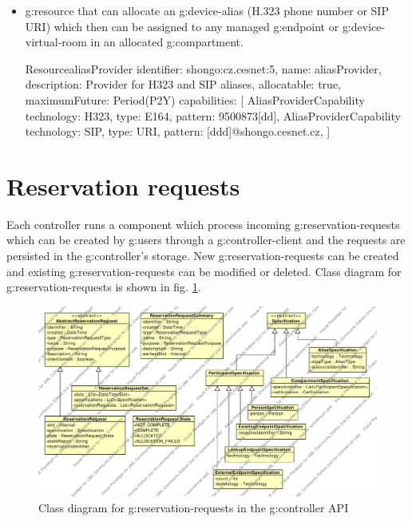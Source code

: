 \begin{itemize}
\item \Gls{g:resource} that can allocate an \gls{g:device-alias} (H.323 phone number or SIP URI) which then can be assigned to any managed \gls{g:endpoint} or \gls{g:device-virtual-room} in an allocated \gls{g:compartment}.

\begin{ObjectCode}{Resource}{aliasProvider}{}
identifier: shongo:cz.cesnet:5,
name: aliasProvider,
description: Provider for H323 and SIP aliases,
allocatable: true,
maximumFuture: Period(P2Y)
capabilities: [  
  AliasProviderCapability {
    technology: H323,
    type: E164,
    pattern: 9500873[dd],
  }
  AliasProviderCapability {
    technology: SIP,
    type: URI,
    pattern: [ddd]@shongo.cesnet.cz,
  }
]
\end{ObjectCode}

\end{itemize}


\section{Reservation requests}

Each controller runs a component which process incoming \glspl{g:reservation-request} which can be created by \glspl{g:user} through a \gls{g:controller-client} and the requests are persisted in the \gls{g:controller}'s storage. New \glspl{g:reservation-request} can be created and existing \glspl{g:reservation-request} can be modified or deleted. Class diagram for \glspl{g:reservation-request} is shown in fig. \ref{fig:cd_api_reservation_requests}.

\begin{figure}[ht!]
\includegraphics[width=\textwidth]{diagrams/cd_api_reservation_requests}
\caption{Class diagram for \glspl{g:reservation-request} in the \gls{g:controller} API}
\label{fig:cd_api_reservation_requests}
\end{figure}

